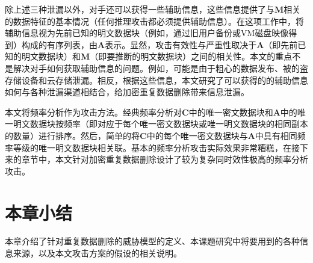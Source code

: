 除上述三种泄漏以外，对手还可以获得一些辅助信息，这些信息提供了与$\mathbf{M}$相关的数据特征的基本情况（任何推理攻击都必须提供辅助信息）。在这项工作中，将辅助信息视为先前已知的明文数据块（例如，通过旧用户备份或VM磁盘映像得到）构成的有序列表，由$\mathbf{A}$表示。显然，攻击有效性与严重性取决于$\mathbf{A}$（即先前已知的明文数据块）和$\mathbf{M}$（即要推断的明文数据块）之间的相关性。本文的重点不是解决对手如何获取辅助信息的问题。例如，可能是由于粗心的数据发布、被的盗存储设备和云存储泄漏。相反，根据这些信息，本文研究了可以获得的的辅助信息如何与各种泄漏渠道相结合，给加密重复数据删除带来信息泄漏。

本文将频率分析作为攻击方法。经典频率分析对$\mathbf{C}$中的唯一密文数据块和$\mathbf{A}$中的唯一明文数据块按频率（即对应于每个唯一密文数据块或唯一明文数据块的相同副本的数量）进行排序。然后，简单的将$\mathbf{C}$中的每个唯一密文数据块与$\mathbf{A}$中具有相同频率等级的唯一明文数据块相关联。基本的频率分析攻击实际效果非常糟糕，在接下来的章节中，本文针对加密重复数据删除设计了较为复杂同时效性极高的频率分析攻击。

\section{本章小结}

本章介绍了针对重复数据删除的威胁模型的定义、本课题研究中将要用到的各种信息来源，以及本文攻击方案的假设的相关说明。





